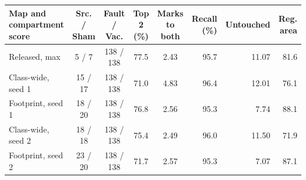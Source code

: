 \begin{tabular}{lccccrrr}
\toprule
Map and compartment score & Src. / Sham & Fault / Vac. & Top 2 (\%) & Marks to both & Recall (\%) & Untouched & Reg. area \\
\midrule
Released, max & 5 / 7 & 138 / 138 & 77.5 & 2.43 & 95.7 & 11.07 & 81.6 \\
\midrule
Class-wide, seed 1 & 15 / 17 & 138 / 138 & 71.0 & 4.83 & 96.4 & 12.01 & 76.1 \\
Footprint, seed 1 & 18 / 20 & 138 / 138 & 76.8 & 2.56 & 95.3 & 7.74 & 88.1 \\
\midrule
Class-wide, seed 2 & 18 / 18 & 138 / 138 & 75.4 & 2.49 & 96.0 & 11.50 & 71.9 \\
Footprint, seed 2 & 23 / 20 & 138 / 138 & 71.7 & 2.57 & 95.3 & 7.07 & 87.1 \\
\bottomrule
\end{tabular}
